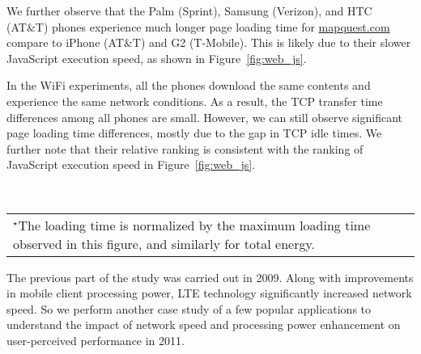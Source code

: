 We further observe that the Palm (Sprint), Samsung (Verizon), and 
HTC (AT\&T) phones experience much longer page loading time for
\url{mapquest.com} compare to iPhone (AT\&T) and G2 (T-Mobile). 
This is likely due to their slower JavaScript execution speed,
as shown in Figure~\ref{fig:web_js}. 


In the WiFi experiments, all the phones download the same contents and 
experience the same network conditions. As a result, the TCP transfer
time differences among all phones are small. However, we can still 
observe significant page loading time differences, mostly due to the
gap in TCP idle times. We further note that their relative ranking is 
consistent with the ranking of JavaScript execution speed in 
Figure~\ref{fig:web_js}.


\begin{figure*}[t]
\centering
{} \\
\begin{tabular}{l}
\\{\scriptsize $^\star$The loading time is normalized by the maximum loading time observed in this figure, and similarly for total energy.}
\end{tabular}
\label{fig:app.compare}
\end{figure*}

The previous part of the study was carried out in 2009. Along with improvements in mobile client processing power, LTE technology significantly increased network speed. So we perform another case study of a few popular applications to understand the impact of network speed and processing power enhancement on user-perceived performance in 2011.


